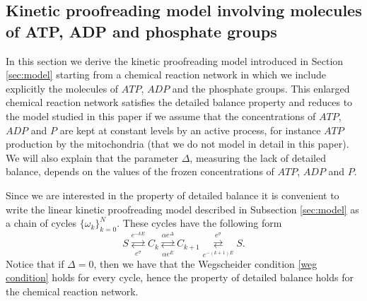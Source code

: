 \documentclass{article}
\numberwithin{equation}{section}
\theoremstyle{plain}
\begin{document}
\subsection{Kinetic proofreading model involving molecules of ATP,  ADP and phosphate groups}
In this section we derive the kinetic proofreading model introduced in Section \ref{sec:model} starting from a chemical reaction network in which we include explicitly the molecules of $ATP$, $ADP $ and the phosphate groups. This enlarged chemical reaction network satisfies the detailed balance property and reduces to the model studied in this paper if we assume that the concentrations of  $ATP $, $ADP $ and  $P$ are kept at constant levels by an active process, for instance $ATP $ production by the mitochondria (that we do not model in detail in this paper). 
We will also  explain that the parameter $\Delta $, measuring the lack of detailed balance, depends on the values of the frozen concentrations of $ATP $, $ADP $ and $P$. 

Since we are interested in the property of detailed balance it is convenient to write the linear kinetic proofreading model described in Subsection \ref{sec:model} as a chain of cycles $ \{ \omega_k \}_{k=0}^{N} $. These cycles have the following form 
\begin{equation}\label{cycle to complete}
S \overset{e^{- k E} }{\underset{e^\sigma} \rightleftarrows} C_k  \overset{\alpha e^\Delta }{\underset{\alpha e^E }\rightleftarrows } C_{k+1} \overset{e^\sigma}{\underset{e^{- (k+1)E}} \rightleftarrows} S. 
\end{equation}
Notice that if $\Delta =0$, then we have that the Wegscheider condition \eqref{weg condition} holds for every cycle, hence the property of detailed balance holds for the chemical reaction network. 
 
\end{document}
